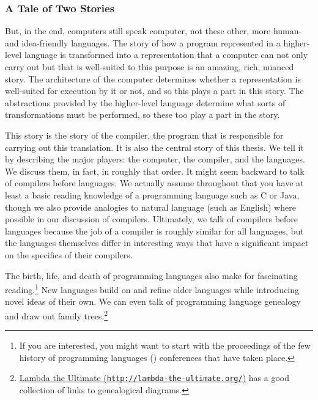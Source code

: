 \subsubsection*{A Tale of Two Stories}
But, in the end, computers still speak computer, not these other, more human- and idea-friendly languages. The story of how a program represented in a higher-level language is transformed into a representation that a computer can not only carry out but that is well-suited to this purpose is an amazing, rich, nuanced story. The architecture of the computer determines whether a representation is well-suited for execution by it or not, and so this plays a part in this story. The abstractions provided by the higher-level language determine what sorts of transformations must be performed, so these too play a part in the story.

This story is the story of the compiler, the program that is responsible for carrying out this translation. It is also the central story of this thesis. We tell it by describing the major players: the computer, the compiler, and the languages. We discuss them, in fact, in roughly that order. It might seem backward to talk of compilers before languages. We actually assume throughout that you have at least a basic reading knowledge of a programming language such as C or Java, though we also provide analogies to natural language (such as English) where possible in our discussion of compilers. Ultimately, we talk of compilers before languages because the job of a compiler is roughly similar for all languages, but the languages themselves differ in interesting ways that have a significant impact on the specifics of their compilers.

The birth, life, and death of programming languages also make for fascinating reading.\footnote{If you are interested, you might want to start with the proceedings of the few history of programming languages () conferences that have taken place.} New languages build on and refine older languages while introducing novel ideas of their own. We can even talk of programming language genealogy and draw out family trees.\footnote{\href{http://lambda-the-ultimate.org/}{Lambda the Ultimate (\nolinkurl{http://lambda-the-ultimate.org/})} has a good collection of links to genealogical diagrams.}

